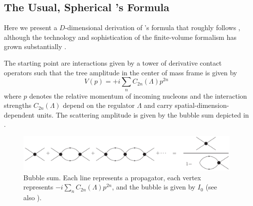 \subsection{The Usual, Spherical \Luscher's Formula}\label{sec:spherical}


Here we present a $D$-dimensional derivation of \Luscher's formula that roughly follows , although the technology and sophistication of the finite-volume formalism has grown substantially \cite{Zhu:2019dho}.

The starting point are interactions given by a tower of derivative contact operators such that the tree amplitude in the center of mass frame is given by
\begin{equation}
    V(p) = + i\sum_n C_{2n}(\Lambda) p^{2n}
\end{equation}
where $p$ denotes the relative momentum of incoming nucleons and the interaction strengths $ C_{2n}(\Lambda)$ depend on the regulator $\Lambda$ and carry spatial-dimension-dependent units.
The scattering amplitude is given by the bubble sum depicted in .

\begin{figure}[ht!]
\center
\includegraphics[width=\columnwidth]{figure/bubbleSum.pdf}
\caption{Bubble sum. Each line represents a propagator, each vertex represents $-i \sum_n C_{2n}(\Lambda) p^{2n}$, and the bubble is given by $I_0$ (see also ).\label{fig:bubbleSum}}
\end{figure}


